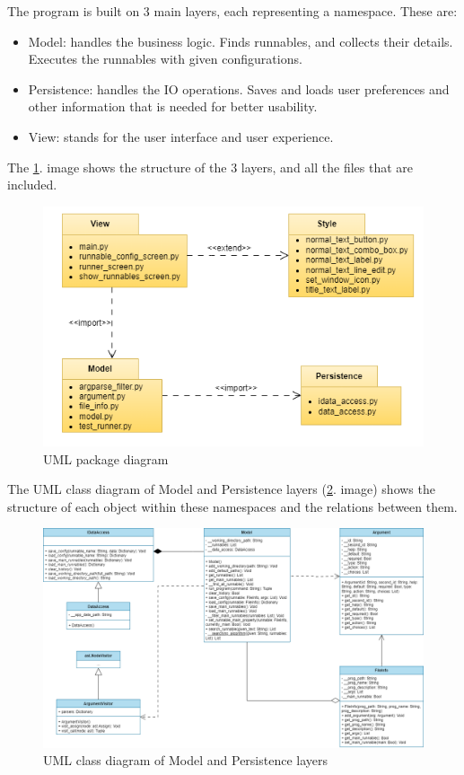 \documentclass{article}
\begin{document}
The program is built on 3 main layers, each representing a namespace. These are:

\begin{itemize}
    \item Model: handles the business logic. Finds runnables, and collects their details. Executes the runnables with given configurations.
    \item Persistence: handles the IO operations. Saves and loads user preferences and other information that is needed for better usability.
    \item View: stands for the user interface and user experience.
\end{itemize}

The \ref{fig:umlpackage}. image shows the structure of the 3 layers, and all the files that are included. 

\begin{figure}[h]
    \centering
    \includegraphics[width=1\linewidth]{img/package_diagram.drawio.png}
    \caption{UML package diagram}
    \label{fig:umlpackage}
\end{figure}

\FloatBarrier

The UML class diagram of Model and Persistence layers (\ref{fig:umlmodel}. image) shows the structure of each object within these namespaces and the relations between them.

\begin{figure}[h]
    \centering
    \includegraphics[width=1\linewidth]{img/class_diagram_model_persistence.drawio.png}
    \caption{UML class diagram of Model and Persistence layers}
    \label{fig:umlmodel}
\end{figure}
\end{document}
